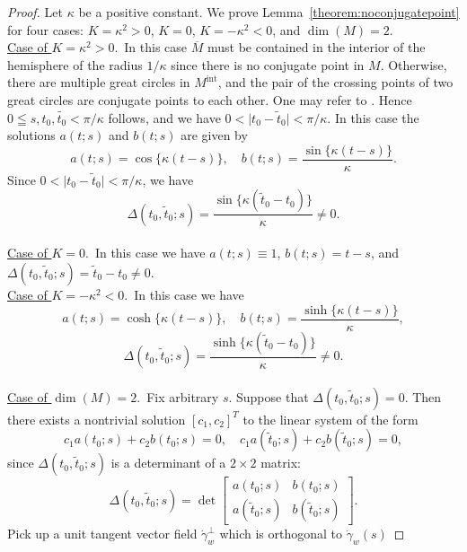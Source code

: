 \documentclass[a4paper,11pt,reqno]{amsart}
\numberwithin{equation}{section}
\theoremstyle{definition}
\theoremstyle{remark}
\begin{document}
\begin{proof}
Let $\kappa$ be a positive constant. 
We prove Lemma~\ref{theorem:noconjugatepoint} for four cases: 
$K=\kappa^2>0$, $K=0$, $K=-\kappa^2<0$, and $\operatorname{dim}(M)=2$.
%
%
\vspace{6pt}
\\
%
%
\underline{Case of $K=\kappa^2>0$}.\ 
In this case $\overline{M}$ must be contained 
in the interior of the hemisphere of the radius $1/\kappa$ 
since there is no conjugate point in $M$. 
Otherwise, there are multiple great circles in $M^\text{int}$, 
and the pair of the crossing points of two great circles are conjugate points to each other. 
One may refer to \cite[Chapter~13, 2.4 Example]{doCarmo}. 
Hence $0 \leqq s, t_0, \tilde{t_0} < \pi/\kappa$ follows, 
and we have $0<\lvert{t_0-\tilde{t}_0}\rvert<\pi/\kappa$. 
In this case the solutions $a(t;s)$ and $b(t;s)$ are given by 
%
%
$$
a(t;s)
=
\cos\{\kappa(t-s)\}, 
\quad
b(t;s)
=
\frac{\sin\{\kappa(t-s)\}}{\kappa}. 
$$
%
%
Since $0<\lvert{t_0-\tilde{t}_0}\rvert<\pi/\kappa$, we have 
%
%
$$
\Delta(t_0,\tilde{t}_0;s)
=
\frac{\sin\{\kappa(\tilde{t}_0-t_0)\}}{\kappa}
\ne
0.
$$
%
%
%
\vspace{6pt}
\\
%
%  
\underline{Case of $K=0$}.\ 
In this case we have $a(t;s)\equiv1$, $b(t;s)=t-s$, 
and $\Delta(t_0,\tilde{t}_0;s)=\tilde{t}_0-t_0\ne0$.
%
%
\vspace{6pt}
\\
%
%  
\underline{Case of $K=-\kappa^2<0$}.\ 
In this case we have 
%
%
$$
a(t;s)=\cosh\{\kappa(t-s)\}, 
\quad 
b(t;s)=\frac{\sinh\{\kappa(t-s)\}}{\kappa}, 
$$
%
%
$$
\Delta(t_0,\tilde{t}_0;s)=\frac{\sinh\{\kappa(\tilde{t}_0-t_0)\}}{\kappa}\ne0.
$$
%
%
\vspace{6pt}
\\
%
%  
\underline{Case of $\operatorname{dim}(M)=2$}.\ 
Fix arbitrary $s$. Suppose that $\Delta(t_0,\tilde{t}_0;s)=0$.  
Then there exists a nontrivial solution $[c_1,c_2]^T$ to the linear system of the form 
%
%
$$
c_1a(t_0;s) + c_2b(t_0;s)=0, 
\quad
c_1a(\tilde{t}_0;s) + c_2b(\tilde{t}_0;s)=0,  
$$
%
%
since $\Delta(t_0,\tilde{t}_0;s)$ is a determinant of a $2\times2$ matrix:
%
%
$$
\Delta(t_0,\tilde{t}_0;s)
=
\operatorname{det}
\begin{bmatrix}
a(t_0;s) & b(t_0;s) 
\\
a(\tilde{t}_0;s) & b(\tilde{t}_0;s) 
\end{bmatrix}. 
$$
%
%
Pick up a unit tangent vector field $\dot{\gamma}_w^\perp$  which is orthogonal to $\dot{\gamma}_w(s) $ 

\end{proof}
\end{document}

